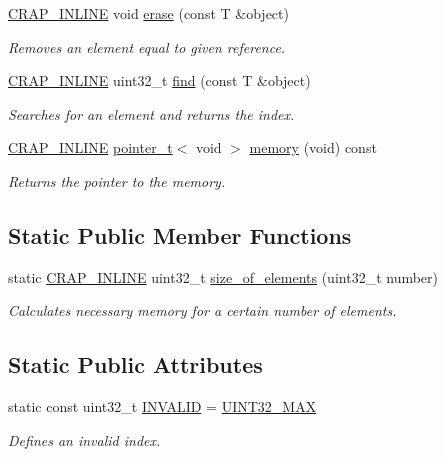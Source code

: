 \begin{DoxyCompactItemize}
\hyperlink{config__x86_8h_a5a40526b8d842e7ff731509998bb0f1c}{C\+R\+A\+P\+\_\+\+I\+N\+L\+I\+N\+E} void \hyperlink{classcrap_1_1list_aa27b7effb6d4f3722bdeef510644dffb}{erase} (const T \&object)
\begin{DoxyCompactList}\small\item\em Removes an element equal to given reference. \end{DoxyCompactList}\item 
\hyperlink{config__x86_8h_a5a40526b8d842e7ff731509998bb0f1c}{C\+R\+A\+P\+\_\+\+I\+N\+L\+I\+N\+E} uint32\+\_\+t \hyperlink{classcrap_1_1list_ae739feefb029d29431ac04e5434bcb10}{find} (const T \&object)
\begin{DoxyCompactList}\small\item\em Searches for an element and returns the index. \end{DoxyCompactList}\item 
\hyperlink{config__x86_8h_a5a40526b8d842e7ff731509998bb0f1c}{C\+R\+A\+P\+\_\+\+I\+N\+L\+I\+N\+E} \hyperlink{structcrap_1_1pointer__t}{pointer\+\_\+t}$<$ void $>$ \hyperlink{classcrap_1_1list_afe0f3c4215857ef0996e826496403330}{memory} (void) const 
\begin{DoxyCompactList}\small\item\em Returns the pointer to the memory. \end{DoxyCompactList}\end{DoxyCompactItemize}
\subsection*{Static Public Member Functions}
\begin{DoxyCompactItemize}
\item 
static \hyperlink{config__x86_8h_a5a40526b8d842e7ff731509998bb0f1c}{C\+R\+A\+P\+\_\+\+I\+N\+L\+I\+N\+E} uint32\+\_\+t \hyperlink{classcrap_1_1list_a495a51ee86d8c65e62c2439635f4bec4}{size\+\_\+of\+\_\+elements} (uint32\+\_\+t number)
\begin{DoxyCompactList}\small\item\em Calculates necessary memory for a certain number of elements. \end{DoxyCompactList}\end{DoxyCompactItemize}
\subsection*{Static Public Attributes}
\begin{DoxyCompactItemize}
\item 
static const uint32\+\_\+t \hyperlink{classcrap_1_1list_af6ca677970fb2d6f6f22b82d89e9b183}{I\+N\+V\+A\+L\+I\+D} = \hyperlink{crap__types_8h_ab5eb23180f7cc12b7d6c04a8ec067fdd}{U\+I\+N\+T32\+\_\+\+M\+A\+X}
\begin{DoxyCompactList}\small\item\em Defines an invalid index. \end{DoxyCompactList}\end{DoxyCompactItemize}
